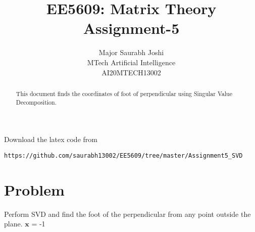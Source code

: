 \documentclass[journal,12pt,twocolumn]{IEEEtran}
\begin{document}
\makeatletter
{}
\makeatother
\let\StandardTheFigure\thefigure
\let\vec\mathbf
\renewcommand{\thefigure}{\theproblem}
\def\putbox#1#2#3{\makebox[0in][l]{\makebox[#1][l]{}\raisebox{\baselineskip}[0in][0in]{\raisebox{#2}[0in][0in]{#3}}}}
     \def\rightbox#1{\makebox[0in][r]{#1}}
     \def\centbox#1{\makebox[0in]{#1}}
     \def\topbox#1{\raisebox{-\baselineskip}[0in][0in]{#1}}
     \def\midbox#1{\raisebox{-0.5\baselineskip}[0in][0in]{#1}}
\vspace{3cm}
\title{EE5609: Matrix Theory\\
          Assignment-5\\}
\author{Major Saurabh Joshi\\MTech Artificial Intelligence\\AI20MTECH13002 }
\maketitle
\newpage
\bigskip
\renewcommand{\thefigure}{\theenumi}
\renewcommand{\thetable}{\theenumi}
\begin{abstract}
This  document finds the coordinates of foot of perpendicular using Singular Value Decomposition. 
\end{abstract}
Download the latex code from 
%
%
%
\begin{lstlisting}
https://github.com/saurabh13002/EE5609/tree/master/Assignment5_SVD
\end{lstlisting}
%
\section{Problem}
Perform SVD and find the foot of the perpendicular from any point outside the plane.
 $\vec{x}$ = -1
\end{document}
